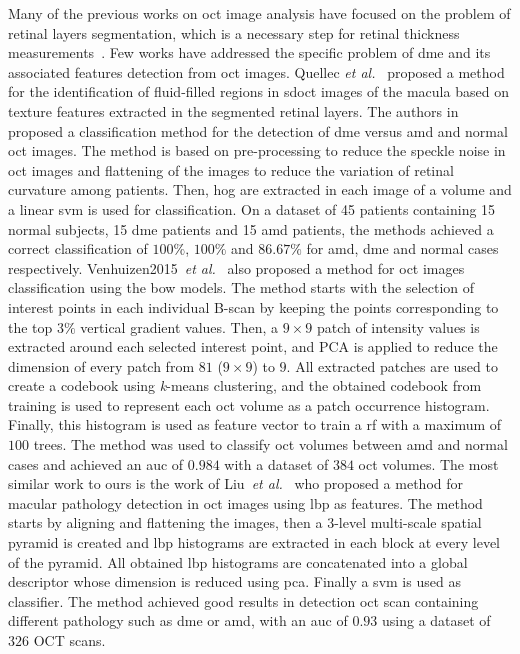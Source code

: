Many of the previous works on \ac{oct} image analysis have focused on the problem of retinal layers segmentation, which is a necessary step for retinal thickness measurements~\cite{Chiu2010,Kafieh2013}.
Few works have addressed the specific problem of \ac{dme} and its associated features detection from \ac{oct} images. Quellec \textit{et al.}~\cite{Quellec2010} proposed a method for the identification of fluid-filled regions in \ac{sdoct} images of the macula based on texture features extracted in the segmented retinal layers.
The authors in~\cite{Srinivasan2014} proposed a classification method for the detection of \ac{dme} versus \ac{amd} and normal \ac{oct} images. The method is based on pre-processing to reduce the speckle noise in \ac{oct} images and flattening of the images to reduce the variation of retinal curvature among patients. Then, \ac{hog} are extracted in each image of a volume and a linear \ac{svm} is used for classification. On a dataset of 45 patients containing 15 normal subjects, 15 \ac{dme} patients and 15 \ac{amd} patients, the methods achieved a correct classification of $100 \%$, $100 \%$ and $86.67 \%$ for \ac{amd}, \ac{dme} and normal cases respectively. 
Venhuizen2015~\textit{et al.}~\cite{Venhuizen2015} also proposed a method for \ac{oct} images classification using the \ac{bow} models.
The method starts with the selection of interest points in each individual B-scan by keeping the points corresponding to the top $3 \%$ vertical gradient values. Then, a $ 9\times 9$ patch of intensity values is extracted around each selected interest point, and PCA is applied to reduce the dimension of every patch from $81$ ($9\times 9$) to $9$. 
All extracted patches are used to create a codebook using \textit{k}-means clustering, and the obtained codebook from training is used to represent each \ac{oct} volume as a patch occurrence histogram. Finally, this histogram is used as feature vector to train a \ac{rf} with a maximum of $100$ trees. The method was used to classify \ac{oct} volumes between \ac{amd} and normal cases and achieved an \ac{auc} of $0.984$ with a dataset of $384$ \ac{oct} volumes. 
The most similar work to ours is the work of Liu~\textit{et al.}~\cite{Liu2011} who proposed a method for macular pathology detection in \ac{oct} images using \ac{lbp} as features.
The method starts by aligning and flattening the images, then a $3$-level multi-scale spatial pyramid is created and \ac{lbp} histograms are extracted in each block at every level of the pyramid. All obtained \ac{lbp} histograms are concatenated into a global descriptor whose dimension is reduced using \ac{pca}. Finally a \ac{svm} is used as classifier. The method achieved good results in detection \ac{oct} scan containing different pathology such as \ac{dme} or \ac{amd}, with an \ac{auc} of $0.93$ using a dataset of $326$ OCT scans.  


